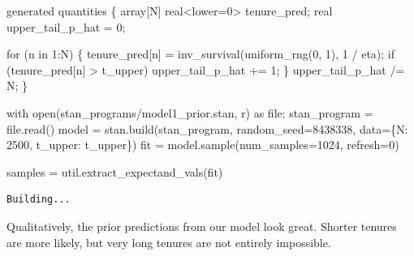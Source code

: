 \documentclass[
  letterpaper,
  DIV=11,
  numbers=noendperiod]{scrartcl}
\newenvironment{Shaded}{\begin{snugshade}}{\end{snugshade}}
\newcommand{\BuiltInTok}[1]{\textcolor[rgb]{0.00,0.23,0.31}{#1}}
\newcommand{\ControlFlowTok}[1]{\textcolor[rgb]{0.00,0.23,0.31}{#1}}
\newcommand{\DataTypeTok}[1]{\textcolor[rgb]{0.68,0.00,0.00}{#1}}
\newcommand{\DecValTok}[1]{\textcolor[rgb]{0.68,0.00,0.00}{#1}}
\newcommand{\ImportTok}[1]{\textcolor[rgb]{0.00,0.46,0.62}{#1}}
\newcommand{\KeywordTok}[1]{\textcolor[rgb]{0.00,0.23,0.31}{#1}}
\newcommand{\NormalTok}[1]{\textcolor[rgb]{0.00,0.23,0.31}{#1}}
\newcommand{\OperatorTok}[1]{\textcolor[rgb]{0.37,0.37,0.37}{#1}}
\newcommand{\StringTok}[1]{\textcolor[rgb]{0.13,0.47,0.30}{#1}}
\begin{document}
\begin{codelisting}
\begin{Shaded}
\begin{Highlighting}[]
\KeywordTok{generated quantities}\NormalTok{ \{}
  \DataTypeTok{array}\NormalTok{[N] }\DataTypeTok{real}\NormalTok{\textless{}}\KeywordTok{lower}\NormalTok{=}\DecValTok{0}\NormalTok{\textgreater{} tenure\_pred;}
  \DataTypeTok{real}\NormalTok{ upper\_tail\_p\_hat = }\DecValTok{0}\NormalTok{;}

  \ControlFlowTok{for}\NormalTok{ (n }\ControlFlowTok{in} \DecValTok{1}\NormalTok{:N) \{}
\NormalTok{    tenure\_pred[n]}
\NormalTok{      = inv\_survival(uniform\_rng(}\DecValTok{0}\NormalTok{, }\DecValTok{1}\NormalTok{), }\DecValTok{1}\NormalTok{ / eta);}
    \ControlFlowTok{if}\NormalTok{ (tenure\_pred[n] \textgreater{} t\_upper)}
\NormalTok{      upper\_tail\_p\_hat += }\DecValTok{1}\NormalTok{;}
\NormalTok{  \}}
\NormalTok{  upper\_tail\_p\_hat /= N;}
\NormalTok{\}}
\end{Highlighting}
\end{Shaded}

\end{codelisting}

\begin{Shaded}
\begin{Highlighting}[]
\ControlFlowTok{with} \BuiltInTok{open}\NormalTok{(}\StringTok{\textquotesingle{}stan\_programs/model1\_prior.stan\textquotesingle{}}\NormalTok{, }\StringTok{\textquotesingle{}r\textquotesingle{}}\NormalTok{) }\ImportTok{as} \BuiltInTok{file}\NormalTok{:}
\NormalTok{  stan\_program }\OperatorTok{=} \BuiltInTok{file}\NormalTok{.read()}
\NormalTok{model }\OperatorTok{=}\NormalTok{ stan.build(stan\_program,}
\NormalTok{                   random\_seed}\OperatorTok{=}\DecValTok{8438338}\NormalTok{,}
\NormalTok{                   data}\OperatorTok{=}\NormalTok{\{}\StringTok{\textquotesingle{}N\textquotesingle{}}\NormalTok{: }\DecValTok{2500}\NormalTok{, }\StringTok{\textquotesingle{}t\_upper\textquotesingle{}}\NormalTok{: t\_upper\})}
\NormalTok{fit }\OperatorTok{=}\NormalTok{ model.sample(num\_samples}\OperatorTok{=}\DecValTok{1024}\NormalTok{, refresh}\OperatorTok{=}\DecValTok{0}\NormalTok{)}

\NormalTok{samples }\OperatorTok{=}\NormalTok{ util.extract\_expectand\_vals(fit)}
\end{Highlighting}
\end{Shaded}

\begin{verbatim}
Building...
\end{verbatim}

Qualitatively, the prior predictions from our model look great. Shorter
tenures are more likely, but very long tenures are not entirely
impossible.
\end{document}
